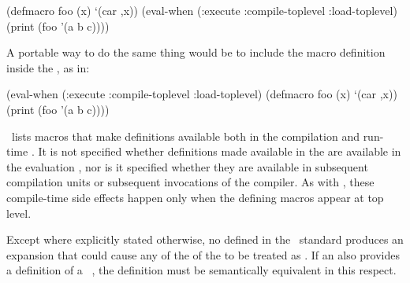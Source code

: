\code
 (defmacro foo (x) `(car ,x))
 (eval-when (:execute :compile-toplevel :load-toplevel)
   (print (foo '(a b c))))
\endcode
    
A portable way to do the same thing would be to include the macro
definition inside the  , as in:
    
\code
 (eval-when (:execute :compile-toplevel :load-toplevel)
   (defmacro foo (x) `(car ,x))
   (print (foo '(a b c))))
\endcode



\Thenextfigure\ lists macros that make definitions
available both in the compilation and run-time .
It is not specified whether definitions made available in the
 are available in the evaluation
, nor is it specified whether they are available
in subsequent compilation units or subsequent invocations of the
compiler.  As with , these compile-time side
effects happen only when the defining macros appear at 
top level.
 


\endsubsubsubsection%



Except where explicitly stated otherwise, no  defined in
the \clisp\ standard produces an expansion that could cause any of the
 of the  to be treated as 
.  If an  also provides a
 definition of a \clisp\ , 
the  definition must be semantically equivalent
in this respect.

